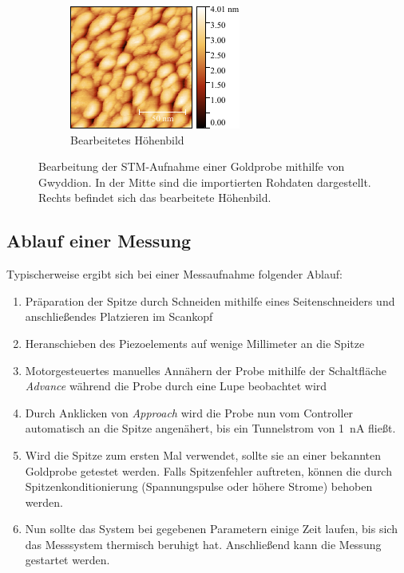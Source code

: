 \documentclass[a4paper,twoside,final]{article}
\begin{document}
\begin{figure}[htp]
\begin{subfigure}{0.3\textwidth}
        \includegraphics[width=\textwidth]{Bilder/Image01963_bearbeitet.pdf}
        \caption{Bearbeitetes Höhenbild}
    \end{subfigure}
    \caption{Bearbeitung der STM-Aufnahme einer Goldprobe mithilfe von Gwyddion. In der Mitte sind die importierten Rohdaten dargestellt. Rechts befindet sich das bearbeitete Höhenbild.}
    \label{fig:Bildbearbeitung}
\end{figure}
\subsection{Ablauf einer Messung}
Typischerweise ergibt sich bei einer Messaufnahme folgender Ablauf:
\begin{enumerate}
  \item Präparation der Spitze durch Schneiden mithilfe eines Seitenschneiders und anschließendes Platzieren im Scankopf
  \item Heranschieben des Piezoelements auf wenige Millimeter an die Spitze
  \item Motorgesteuertes manuelles Annähern der Probe mithilfe der Schaltfläche \textit{Advance} während die Probe durch eine Lupe beobachtet wird
  \item Durch Anklicken von \textit{Approach} wird die Probe nun vom Controller automatisch an die Spitze angenähert, bis ein Tunnelstrom von \SI{1}{\nano\ampere} fließt.
  \item Wird die Spitze zum ersten Mal verwendet, sollte sie an einer bekannten Goldprobe getestet werden. Falls Spitzenfehler auftreten, können die durch Spitzenkonditionierung (Spannungspulse oder höhere Strome) behoben werden.
  \item Nun sollte das System bei gegebenen Parametern einige Zeit laufen, bis sich das Messsystem thermisch beruhigt hat. Anschließend kann die Messung gestartet werden.
\end{enumerate}
\newpage
\end{document}
